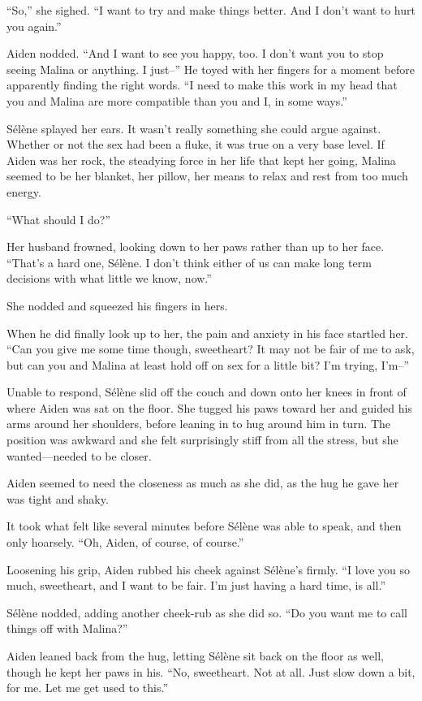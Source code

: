 ``So,'' she sighed. ``I want to try and make things better. And I don't want to hurt you again.''

Aiden nodded. ``And I want to see you happy, too. I don't want you to stop seeing Malina or anything. I just--'' He toyed with her fingers for a moment before apparently finding the right words. ``I need to make this work in my head that you and Malina are more compatible than you and I, in some ways.''

Sélène splayed her ears. It wasn't really something she could argue against. Whether or not the sex had been a fluke, it was true on a very base level. If Aiden was her rock, the steadying force in her life that kept her going, Malina seemed to be her blanket, her pillow, her means to relax and rest from too much energy.

``What should I do?''

Her husband frowned, looking down to her paws rather than up to her face. ``That's a hard one, Sélène. I don't think either of us can make long term decisions with what little we know, now.''

She nodded and squeezed his fingers in hers.

When he did finally look up to her, the pain and anxiety in his face startled her. ``Can you give me some time though, sweetheart? It may not be fair of me to ask, but can you and Malina at least hold off on sex for a little bit? I'm trying, I'm--''

Unable to respond, Sélène slid off the couch and down onto her knees in front of where Aiden was sat on the floor. She tugged his paws toward her and guided his arms around her shoulders, before leaning in to hug around him in turn. The position was awkward and she felt surprisingly stiff from all the stress, but she wanted---needed to be closer.

Aiden seemed to need the closeness as much as she did, as the hug he gave her was tight and shaky.

It took what felt like several minutes before Sélène was able to speak, and then only hoarsely. ``Oh, Aiden, of course, of course.''

Loosening his grip, Aiden rubbed his cheek against Sélène's firmly. ``I love you so much, sweetheart, and I want to be fair. I'm just having a hard time, is all.''

Sélène nodded, adding another cheek-rub as she did so. ``Do you want me to call things off with Malina?''

Aiden leaned back from the hug, letting Sélène sit back on the floor as well, though he kept her paws in his. ``No, sweetheart. Not at all. Just slow down a bit, for me. Let me get used to this.''

